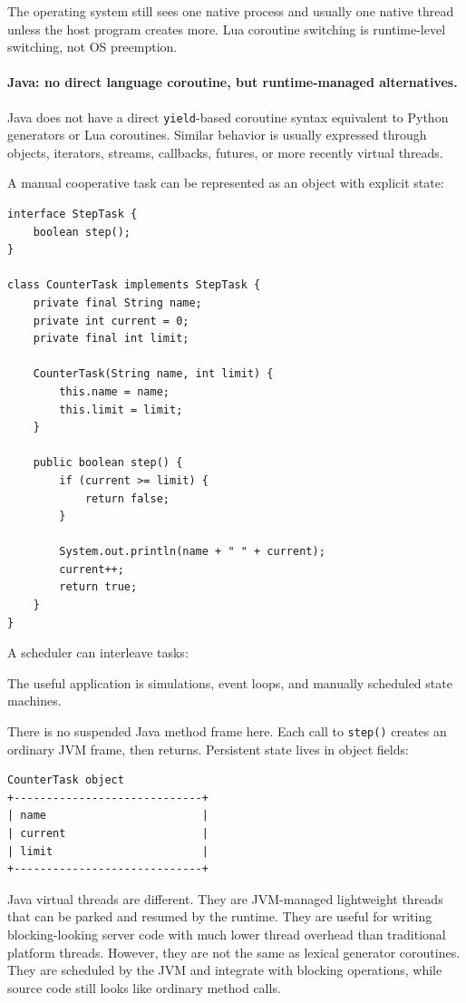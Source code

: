 The operating system still sees one native process and usually one native thread unless the host program creates more. Lua coroutine switching is runtime-level switching, not OS preemption.

\paragraph{Java: no direct language coroutine, but runtime-managed alternatives.}

Java does not have a direct \texttt{yield}-based coroutine syntax equivalent to Python generators or Lua coroutines. Similar behavior is usually expressed through objects, iterators, streams, callbacks, futures, or more recently virtual threads.

A manual cooperative task can be represented as an object with explicit state:

\begin{verbatim}
interface StepTask {
    boolean step();
}

class CounterTask implements StepTask {
    private final String name;
    private int current = 0;
    private final int limit;

    CounterTask(String name, int limit) {
        this.name = name;
        this.limit = limit;
    }

    public boolean step() {
        if (current >= limit) {
            return false;
        }

        System.out.println(name + " " + current);
        current++;
        return true;
    }
}
\end{verbatim}

A scheduler can interleave tasks:

The useful application is simulations, event loops, and manually scheduled state machines.

There is no suspended Java method frame here. Each call to \texttt{step()} creates an ordinary JVM frame, then returns. Persistent state lives in object fields:

\begin{verbatim}
CounterTask object
+-----------------------------+
| name                        |
| current                     |
| limit                       |
+-----------------------------+
\end{verbatim}

Java virtual threads are different. They are JVM-managed lightweight threads that can be parked and resumed by the runtime. They are useful for writing blocking-looking server code with much lower thread overhead than traditional platform threads. However, they are not the same as lexical generator coroutines. They are scheduled by the JVM and integrate with blocking operations, while source code still looks like ordinary method calls.

